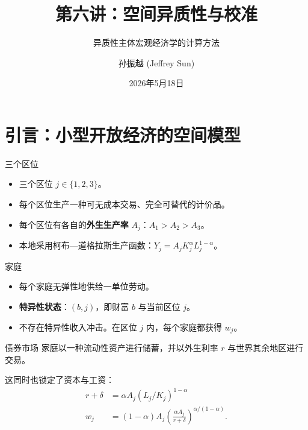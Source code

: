\documentclass[10pt,aspectratio=169]{beamer}
\title{第六讲：空间异质性与校准}
\subtitle{异质性主体宏观经济学的计算方法}
\author{孙振越 (Jeffrey Sun)}
\institute{多伦多大学}
\date{2026年5月18日}
\begin{document}
\maketitle

\section[引言]{引言：小型开放经济的空间模型}

\begin{frame}{三个区位}
  \begin{itemize}
    \item 三个区位 $j\in\{1,2,3\}$。
    \item 每个区位生产一种可无成本交易、完全可替代的计价品。
    \item 每个区位有各自的\textbf{外生生产率} $A_j$：$A_1 > A_2 > A_3$。
    \item 本地采用柯布—道格拉斯生产函数：$Y_j = A_j K_j^{\alpha} L_j^{1-\alpha}$。
  \end{itemize}
\end{frame}

\begin{frame}{家庭}
  \begin{itemize}
    \item 每个家庭无弹性地供给一单位劳动。
    \item \textbf{特异性状态}：$(b, j)$，即财富 $b$ 与当前区位 $j$。
    \item 不存在特异性收入冲击。在区位 $j$ 内，每个家庭都获得 $w_j$。
  \end{itemize}
\end{frame}

\begin{frame}{债券市场}
  家庭以一种流动性资产进行储蓄，并以外生利率 $r$ 与世界其余地区进行交易。

  这同时也锁定了资本与工资：
  \begin{align*}
    r + \delta &= \alpha A_j (L_j / K_j)^{1 - \alpha}\\
    w_j &= (1 - \alpha) A_j \left( \frac{\alpha A_j}{r + \delta} \right)^{\alpha / (1 - \alpha)}.
  \end{align*}
\end{frame}
\end{document}
